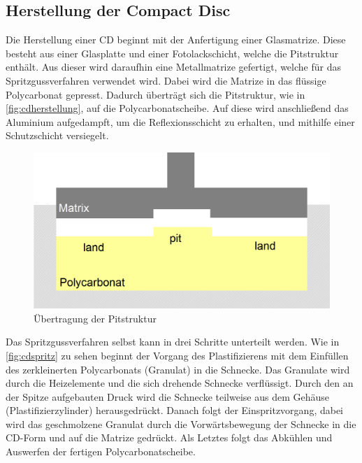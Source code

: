 \subsection{Herstellung der Compact Disc}
\label{subsec:cdherstellung}

Die Herstellung einer CD beginnt mit der Anfertigung einer Glasmatrize. Diese
besteht aus einer Glasplatte und einer Fotolackschicht, welche die Pitstruktur
enthält. Aus dieser wird daraufhin eine Metallmatrize gefertigt, welche für das
Spritzgussverfahren verwendet wird. Dabei wird die Matrize in das flüssige
Polycarbonat gepresst. Dadurch überträgt sich die Pitstruktur, wie in
\autoref{fig:cdherstellung}, auf die Polycarbonatscheibe. Auf diese wird
anschließend das Aluminium aufgedampft, um die Reflexionsschicht zu erhalten,
und mithilfe einer Schutzschicht versiegelt. \cite{cdp}

\begin{figure}[h]
  \begin{center}
      \begin{minipage}[t]{\textwidth}
        \begin{center}
            \includegraphics[height=0.1\textheight]{Bilder/Optische_Datentraeger_Die_Compact_Disc/Herstellung/cdherstellung.png}
            \caption[Übertragung der Pitstruktur \newline \url{http://daten.didaktikchemie.uni-bayreuth.de/umat/cd_dvd/spritzguss.gif} (zuletzt aufgerufen am 07.08.2015)]{Übertragung der Pitstruktur}
            \label{fig:cdherstellung}
        \end{center}
      \end{minipage}
  \end{center}
\end{figure}

Das Spritzgussverfahren selbst kann in drei Schritte unterteilt werden. Wie in
\autoref{fig:cdspritz} zu sehen beginnt der Vorgang des Plastifizierens mit dem
Einfüllen des zerkleinerten Polycarbonats (Granulat) in die Schnecke. Das
Granulate wird durch die Heizelemente und die sich drehende Schnecke
verflüssigt. Durch den an der Spitze aufgebauten Druck wird die Schnecke
teilweise aus dem Gehäuse (Plastifizierzylinder) herausgedrückt. Danach folgt
der Einspritzvorgang, dabei wird das geschmolzene Granulat durch die
Vorwärtsbewegung der Schnecke in die CD-Form und auf die Matrize gedrückt. Als
Letztes folgt das Abkühlen und Auswerfen der fertigen Polycarbonatscheibe.
\cite{cdpf}

